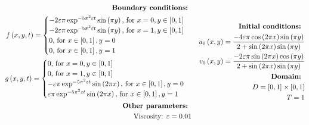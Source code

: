 \begin{equation}
\begin{split}
\text{\textbf{Boundary conditions: }} \\
f\left(x, y, t\right) = \begin{cases}
-2 \varepsilon \pi \exp^{-5 \pi^2 \varepsilon t} \sin\left(\pi y\right) \text{, for } x = 0, y \in \left[0, 1\right] \\
-2 \varepsilon \pi \exp^{-5 \pi^2 \varepsilon t} \sin\left(\pi y\right) \text{, for } x = 1, y \in \left[0, 1\right] \\
0 \text{, for } x \in \left[0, 1\right], y = 0 \\
0 \text{, for } x \in \left[0, 1\right], y = 1 \\
\end{cases}
\\
g\left(x, y, t\right) = \begin{cases}
0 \text{, for } x = 0, y \in \left[0, 1\right] \\
0 \text{, for } x = 1, y \in \left[0, 1\right] \\
-\varepsilon \pi \exp^{-5 \pi^2 \varepsilon t} \sin\left(2 \pi x\right) \text{, for } x \in \left[0, 1\right], y = 0 \\
\varepsilon \pi \exp^{-5 \pi^2 \varepsilon t} \sin\left(2 \pi x\right) \text{, for } x \in \left[0, 1\right], y = 1 \\
\end{cases}
\\
\text{\textbf{Other parameters: }} \\
\text{Viscosity: } \varepsilon = 0.01
\end{split}
\quad
\begin{split}
\text{\textbf{Initial conditions: }} \\
u_0\left(x, y\right) = \frac{-4 \varepsilon \pi \cos \left(2 \pi x\right) \sin \left(\pi y\right)}{2 + \sin \left(2 \pi x \right) \sin \left(\pi y\right)}
\\
v_0\left(x, y\right) = \frac{-2 \varepsilon \pi \sin \left(2 \pi x\right) \cos \left(\pi y\right)}{2 + \sin \left(2 \pi x \right) \sin \left(\pi y\right)}
\\
\text{\textbf{Domain: }} \\
D = \left[0,1\right] \times \left[0,1\right] \\
T = 1 \\
\end{split}
\end{equation}

